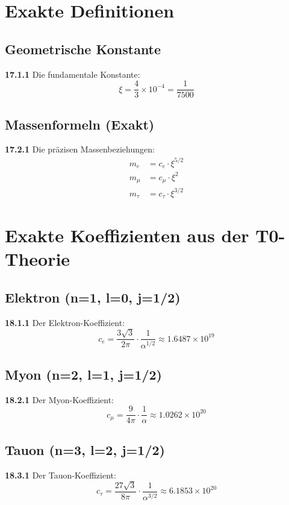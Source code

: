 \documentclass[12pt,a4paper]{article}
\begin{document}
\section{Exakte Definitionen}

\subsection{Geometrische Konstante}
\noindent \textbf{17.1.1} Die fundamentale Konstante:
\begin{equation}
	\xi = \frac{4}{3} \times 10^{-4} = \frac{1}{7500}
\end{equation}

\subsection{Massenformeln (Exakt)}
\noindent \textbf{17.2.1} Die präzisen Massenbeziehungen:
\begin{align}
	m_e &= c_e \cdot \xi^{5/2} \\
	m_\mu &= c_\mu \cdot \xi^2 \\
	m_\tau &= c_\tau \cdot \xi^{3/2}
\end{align}

\section{Exakte Koeffizienten aus der T0-Theorie}

\subsection{Elektron (n=1, l=0, j=1/2)}
\noindent \textbf{18.1.1} Der Elektron-Koeffizient:
\begin{equation}
	c_e = \frac{3\sqrt{3}}{2\pi} \cdot \frac{1}{\alpha^{1/2}} \approx 1.6487 \times 10^{19}
\end{equation}

\subsection{Myon (n=2, l=1, j=1/2)}
\noindent \textbf{18.2.1} Der Myon-Koeffizient:
\begin{equation}
	c_\mu = \frac{9}{4\pi} \cdot \frac{1}{\alpha} \approx 1.0262 \times 10^{20}
\end{equation}

\subsection{Tauon (n=3, l=2, j=1/2)}
\noindent \textbf{18.3.1} Der Tauon-Koeffizient:
\begin{equation}
	c_\tau = \frac{27\sqrt{3}}{8\pi} \cdot \frac{1}{\alpha^{3/2}} \approx 6.1853 \times 10^{20}
\end{equation}
\end{document}
